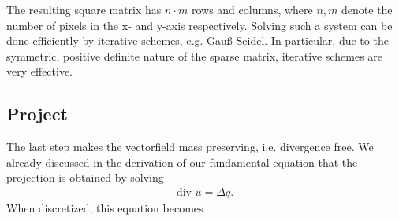 \documentclass[a4paper,10pt,oneside,final,german,openbib,pdftex,titlepage]{scrbook}
\begin{document}
The resulting square matrix has $n\cdot m$ rows and columns, where $n, m$ denote the number of pixels in the x- and y-axis respectively. Solving such a system can be done efficiently by iterative schemes, e.g. Gauß-Seidel. In particular, due to the symmetric, positive definite nature of the sparse matrix, iterative schemes are very effective.\\

\subsection{Project}
The last step makes the vectorfield mass preserving, i.e. divergence free. We already discussed in the derivation of our fundamental equation that the projection is obtained by solving
\begin{align*}
	\text{div }u = \Delta q.
\end{align*}
When discretized, this equation becomes
\end{document}
